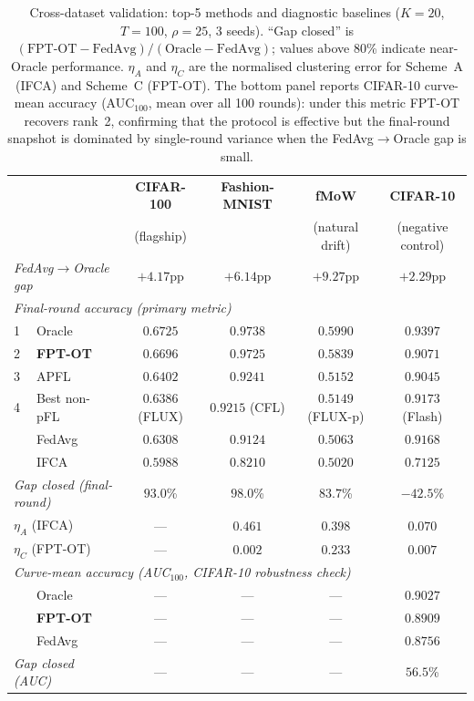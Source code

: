 \begin{table}[h]
\centering
\caption{Cross-dataset validation: top-5 methods and diagnostic baselines ($K{=}20$, $T{=}100$, $\rho{=}25$, 3 seeds). ``Gap closed'' is $(\textrm{FPT-OT} - \textrm{FedAvg}) / (\textrm{Oracle} - \textrm{FedAvg})$; values above 80\% indicate near-Oracle performance. $\eta_A$ and $\eta_C$ are the normalised clustering error for Scheme~A (IFCA) and Scheme~C (FPT-OT). The bottom panel reports CIFAR-10 curve-mean accuracy (AUC$_{100}$, mean over all 100 rounds): under this metric FPT-OT recovers rank~2, confirming that the protocol is effective but the final-round snapshot is dominated by single-round variance when the FedAvg$\to$Oracle gap is small.}
\label{tab:cross_dataset_summary}
\small
\setlength{\tabcolsep}{3pt}
\begin{tabular}{llcccc}
\toprule
& & \textbf{CIFAR-100} & \textbf{Fashion-MNIST} & \textbf{fMoW} & \textbf{CIFAR-10} \\
& & (flagship) & & (natural drift) & (negative control) \\
\midrule
\multicolumn{2}{l}{\emph{FedAvg$\to$Oracle gap}} & $+4.17$pp & $+6.14$pp & $+9.27$pp & $+2.29$pp \\
\midrule
\multicolumn{6}{l}{\emph{Final-round accuracy (primary metric)}} \\
1 & Oracle          & $0.6725$ & $0.9738$ & $0.5990$ & $0.9397$ \\
2 & \textbf{FPT-OT} & $\mathbf{0.6696}$ & $\mathbf{0.9725}$ & $\mathbf{0.5839}$ & $0.9071$ \\
3 & APFL            & $0.6402$ & $0.9241$ & $0.5152$ & $0.9045$ \\
4 & Best non-pFL    & $0.6386$ \tiny{(FLUX)} & $0.9215$ \tiny{(CFL)} & $0.5149$ \tiny{(FLUX-p)} & $0.9173$ \tiny{(Flash)} \\
  & FedAvg          & $0.6308$ & $0.9124$ & $0.5063$ & $0.9168$ \\
  & IFCA            & $0.5988$ & $0.8210$ & $0.5020$ & $0.7125$ \\
\midrule
\multicolumn{2}{l}{\emph{Gap closed (final-round)}} & $93.0$\% & $98.0$\% & $83.7$\% & $-42.5$\% \\
\multicolumn{2}{l}{$\eta_A$ (IFCA)} & — & $0.461$ & $0.398$ & $0.070$ \\
\multicolumn{2}{l}{$\eta_C$ (FPT-OT)} & — & $0.002$ & $0.233$ & $0.007$ \\
\midrule
\multicolumn{6}{l}{\emph{Curve-mean accuracy (AUC$_{100}$, CIFAR-10 robustness check)}} \\
  & Oracle          & — & — & — & $0.9027$ \\
  & \textbf{FPT-OT} & — & — & — & $\mathbf{0.8909}$ \\
  & FedAvg          & — & — & — & $0.8756$ \\
\multicolumn{2}{l}{\emph{Gap closed (AUC)}} & — & — & — & $56.5$\% \\
\bottomrule
\end{tabular}
\end{table}

